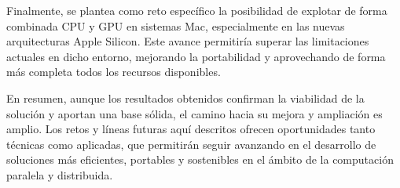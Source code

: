 Finalmente, se plantea como reto específico la posibilidad de explotar de forma combinada CPU y GPU en sistemas Mac, especialmente en las nuevas arquitecturas Apple Silicon. Este avance permitiría superar las limitaciones actuales en dicho entorno, mejorando la portabilidad y aprovechando de forma más completa todos los recursos disponibles.

En resumen, aunque los resultados obtenidos confirman la viabilidad de la solución y aportan una base sólida, el camino hacia su mejora y ampliación es amplio. Los retos y líneas futuras aquí descritos ofrecen oportunidades tanto técnicas como aplicadas, que permitirán seguir avanzando en el desarrollo de soluciones más eficientes, portables y sostenibles en el ámbito de la computación paralela y distribuida.
